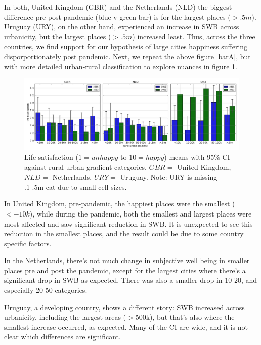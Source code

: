 \documentclass[10pt, letterpaper]{article}
\begin{document}
\begin{spacing}{1.4}
In both, United Kingdom (GBR) and the Netherlands (NLD) the biggest difference
pre-post pandemic (blue v green bar) is for the largest places ($>.5m$). Uruguay
(URY), on the other hand, experienced an increase in SWB across urbanicity, but
the largest places ($>.5m$) increased least. Thus, across the three countries,
we find support for our hypothesis of large cities happiness suffering
disporportionately post pandemic. 
Next, we repeat the above figure \ref{barA}, but with more detailed urban-rural
classification to explore nuances in figure \ref{bar2}.

\begin{figure}[H]
 \includegraphics[width=7in]{bar.pdf}\centering
\caption{\label{bar2}Life satisfaction ($1=unhappy$ to $10=happy$) means with 95\% CI against rural urban gradient categories. $GBR=$ United Kingdom, $NLD=$ Netherlands, $URY=$ Uruguay. Note: URY is missing .1-.5m cat due to small cell sizes.}
 \end{figure}

In United Kingdom, pre-pandemic, the happiest places were the smallest ($<-10k$), while during the pandemic, both the smallest and largest places were most affected and saw significant reduction in SWB. It is unexpected to see this reduction in the smallest places, and the result could be due to some country specific factors.

In the Netherlands, there's not much change in subjective well being in smaller
places pre and post the pandemic, except for the largest cities where there's a
significant drop in SWB as expected. There was also a smaller drop in 10-20, and
especially 20-50 categories. 

Uruguay, a developing country, shows a different story: SWB increased across urbanicity, including the largest areas ($>$500k), but that's also where the smallest increase occurred, as expected.
Many of the CI are wide, and it is not clear which differences are significant.  



\end{spacing}
\end{document}
